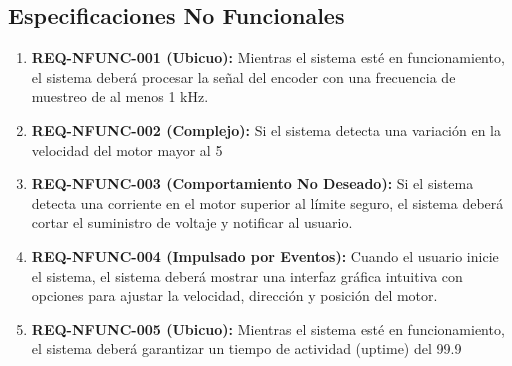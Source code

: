 \documentclass{article}
\begin{document}
\subsection*{Especificaciones No Funcionales}
\begin{enumerate}
    \item \textbf{REQ-NFUNC-001 (Ubicuo):} 
    Mientras el sistema esté en funcionamiento, el sistema deberá procesar la señal del encoder con una frecuencia de muestreo de al menos 1 kHz.

    \item \textbf{REQ-NFUNC-002 (Complejo):} 
    Si el sistema detecta una variación en la velocidad del motor mayor al 5%

    \item \textbf{REQ-NFUNC-003 (Comportamiento No Deseado):} 
    Si el sistema detecta una corriente en el motor superior al límite seguro, el sistema deberá cortar el suministro de voltaje y notificar al usuario.

    \item \textbf{REQ-NFUNC-004 (Impulsado por Eventos):} 
    Cuando el usuario inicie el sistema, el sistema deberá mostrar una interfaz gráfica intuitiva con opciones para ajustar la velocidad, dirección y posición del motor.

    \item \textbf{REQ-NFUNC-005 (Ubicuo):} 
    Mientras el sistema esté en funcionamiento, el sistema deberá garantizar un tiempo de actividad (uptime) del 99.9%
\end{enumerate}
\end{document}
